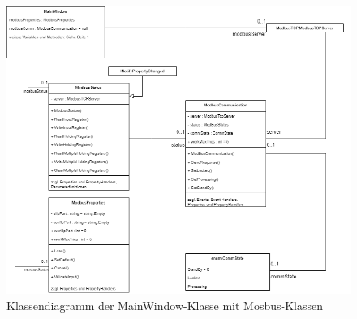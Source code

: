     \begin{figure}[ht]
        \label{fig:figure4}
        \includegraphics[width = \textwidth ]{Bilder/LV_Klassendiagramm_Modbus}
        \caption[Klassendiagramm Modbus ]
        {\small Klassendiagramm der MainWindow-Klasse mit Mosbus-Klassen }
        \centering
    \end{figure}

